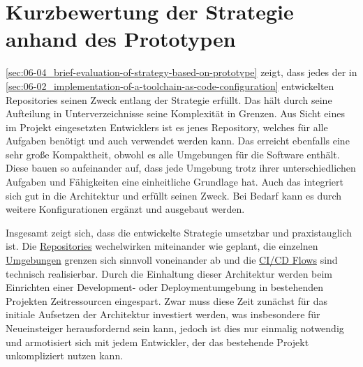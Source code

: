 \section{Kurzbewertung der Strategie anhand des Prototypen}
\label{sec:06-04_brief-evaluation-of-strategy-based-on-prototype}

\autoref{sec:06-04_brief-evaluation-of-strategy-based-on-prototype} zeigt, dass jedes der in \autoref{sec:06-02_implementation-of-a-toolchain-as-code-configuration} entwickelten Repositories seinen Zweck entlang der  Strategie erfüllt. Das  hält durch seine Aufteilung in Unterverzeichnisse seine Komplexität in Grenzen. Aus Sicht eines im Projekt eingesetzten Entwicklers ist es jenes Repository, welches für alle Aufgaben benötigt und auch verwendet werden kann. Das  erreicht ebenfalls eine sehr große Kompaktheit, obwohl es alle Umgebungen für die Software enthält. Diese bauen so aufeinander auf, dass jede Umgebung trotz ihrer unterschiedlichen Aufgaben und Fähigkeiten eine einheitliche Grundlage hat. Auch das  integriert sich gut in die Architektur und erfüllt seinen Zweck. Bei Bedarf kann es durch weitere Konfigurationen ergänzt und ausgebaut werden.

Insgesamt zeigt sich, dass die entwickelte  Strategie umsetzbar und praxistauglich ist. Die \hyperref[subsubsec:05-02-02-01_data-storage-in-repositories]{Repositories} wechelwirken miteinander wie geplant, die einzelnen \hyperref[subsubsec:05-02-02-02_sub-components-in-environments]{Umgebungen} grenzen sich sinnvoll voneinander ab und die \hyperref[subsec:05-02-03_workflows-and-continuity-in-the-toolchain-as-code-approach]{CI/CD Flows} sind technisch realisierbar. Durch die Einhaltung dieser Architektur werden beim Einrichten einer Development- oder Deploymentumgebung in bestehenden Projekten Zeitressourcen eingespart. Zwar muss diese Zeit zunächst für das initiale Aufsetzen der Architektur investiert werden, was insbesondere für Neueinsteiger herausfordernd sein kann, jedoch ist dies nur einmalig notwendig und armotisiert sich mit jedem Entwickler, der das bestehende Projekt unkompliziert nutzen kann.

